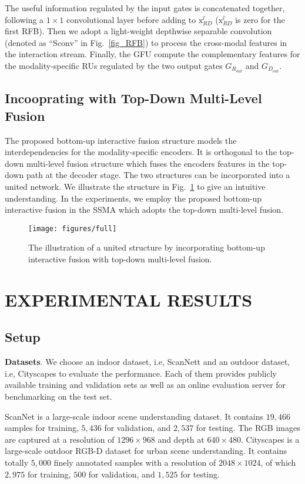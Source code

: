 \documentclass[letterpaper, 10 pt, conference]{ieeeconf}
\begin{document}
	The useful information regulated by the input gates is concatenated together, following a $1\times1$ convolutional layer before adding to $\mathrm{x}^l_{RD}$ ($\mathrm{x}^l_{RD}$ is zero for the first RFB). Then we adopt a light-weight depthwise separable convolution (denoted as ``Sconv'' in Fig.~\ref{fig_RFB}) \cite{howard2017mobilenets} to process the cross-modal features in the interaction stream. Finally, the GFU compute the complementary features for the modality-specific RUs regulated by the two output gates $G_{R_{out}}$ and $G_{D_{out}}$.
	
	\subsection{Incooprating with Top-Down Multi-Level Fusion}
	The proposed bottom-up interactive fusion structure models the interdependencies for the modality-specific encoders. It is orthogonal to the top-down multi-level fusion structure which fuses the encoders features in the top-down path at the decoder stage. The two structures can be incorporated into a united network. We illustrate the structure in Fig.~\ref{fig_united} to give an intuitive understanding. In the experiments, we employ the proposed bottom-up interactive fusion in the SSMA\cite{valada2019self} which adopts the top-down multi-level fusion.
	
	\begin{figure}[!tb]
		\centering
		\texttt{[image: figures/full]}
		\caption{The illustration of a united structure by incorporating bottom-up interactive fusion with top-down multi-level fusion. }
		\label{fig_united}
	\end{figure}
	
	\section{EXPERIMENTAL RESULTS}
	\subsection{Setup}
	\textbf{Datasets}.
	We choose an indoor dataset, i.e, ScanNett\cite{dai2017scannet} and an outdoor dataset, i.e, Cityscapes\cite{cordts2016cityscapes} to evaluate the performance. Each of them provides publicly available training and validation sets as well as an online evaluation server for benchmarking on the test set.
	
	ScanNet is a large-scale indoor scene understanding dataset. It contains $19,466$ samples for training, $5,436$ for validation, and $2,537$ for testing. The RGB images are captured at a resolution of $1296\times 968$ and depth at $640\times 480$. Cityscapes is a large-scale outdoor RGB-D dataset for urban scene understanding. It contains totally $5,000$ finely annotated samples with a resolution of $2048\times 1024$, of which $2,975$ for training, $500$ for validation, and $1,525$ for testing.
	
\end{document}
